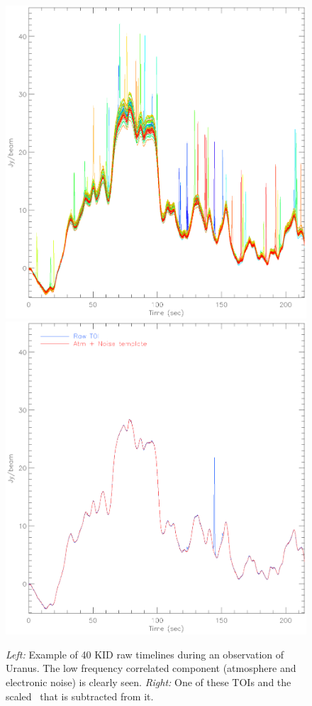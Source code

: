 \begin{figure}[ht!]
\begin{center}
\includegraphics[clip, angle=0, scale=0.4]{Figures/toi_plot.eps}
\includegraphics[clip, angle=0, scale=0.4]{Figures/toi_plot_decorr.eps}
\caption[Example of Time-Ordered-Information]{\emph{Left:} Example of 40 KID raw timelines during an observation
  of Uranus. The low frequency correlated component (atmosphere and electronic
  noise) is clearly seen. \emph{Right:} One of these TOIs and the scaled
  \cm\ that is subtracted from it.}
\label{fig:nika_toi}
\end{center}
\end{figure}

